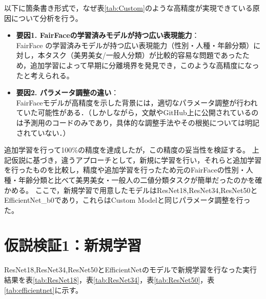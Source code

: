 \documentclass[a4paper,11pt,titlepage]{jsarticle}
\begin{document}
以下に箇条書き形式で，なぜ表\ref{tab:Custom}のような高精度が実現できている原因について分析を行う。

\begin{itemize}
  \item \textbf{要因1. FairFaceの学習済みモデルが持つ広い表現能力}：  \\
  FairFace の学習済みモデルが持つ広い表現能力（性別・人種・年齢分類）に対し，本タスク（美男美女/一般人分類）が比較的容易な問題であったため，追加学習によって早期に分離境界を発見でき，このような高精度になったと考えられる。

  \item \textbf{要因2. パラメータ調整の違い}：  \\
  FairFaceモデルが高精度を示した背景には，適切なパラメータ調整が行われていた可能性がある．（しかしながら，文献\cite{karkkainenFairFace}やGitHub上に公開されているのは予測用のコードのみであり，具体的な調整手法やその根拠については明記されていない．）
\end{itemize}

追加学習を行って100\%の精度を達成したが，この精度の妥当性を検証する。
上記仮説に基づき，違うアプローチとして，新規に学習を行い，それらと追加学習を行ったものを比較し，精度や追加学習を行ったため元のFairFaceの性別・人種・年齢分類と比べて美男美女・一般人の二値分類タスクが簡単だったのかを確かめる。
ここで，新規学習で用意したモデルはResNet18,ResNet34,ResNet50とEfficientNet\_b0であり，これらはCustom Modelと同じパラメータ調整を行った。


\section{仮説検証1：新規学習}
ResNet18,ResNet34,ResNet50とEfficientNetのモデルで新規学習を行なった実行結果を表\ref{tab:ResNet18}，表\ref{tab:ResNet34}，表\ref{tab:ResNet50}，表\ref{tab:efficientnet}に示す。
\end{document}
